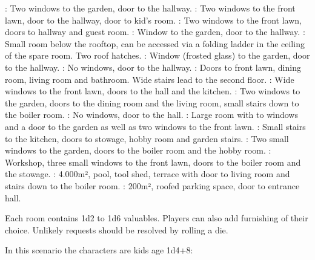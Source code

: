 {		: Two windows to the garden, door to the hallway. : Two windows to the front lawn, door to the hallway, door to kid's room. : Two windows to the front lawn, doors to hallway and guest room. : Window to the garden, door to the hallway. : Small room below the rooftop, can be accessed via a folding ladder in the ceiling of the spare room. Two roof hatches. : Window (frosted glass) to the garden, door to the hallway. : No windows, door to the hallway. : Doors to front lawn, dining room, living room and bathroom. Wide stairs lead to the second floor. : Wide windows to the front lawn, doors to the hall and the kitchen. : Two windows to the garden, doors to the dining room and the living room, small stairs down to the boiler room. : No windows, door to the hall. : Large room with to windows and a door to the garden as well as two windows to the front lawn. :	Small stairs to the kitchen, doors to stowage, hobby room and garden stairs. : Two small windows to the garden, doors to the boiler room and the hobby room. : Workshop, three small windows to the front lawn, doors to the boiler room and the stowage. : 4.000m², pool, tool shed, terrace with door to living room and stairs down to the boiler room. : 200m², roofed parking space, door to entrance hall.

		Each room contains 1d2 to 1d6 valuables. Players can also add furnishing of their choice. Unlikely requests should be resolved by rolling a die.


		\noindent
		In this scenario the characters are kids age 1d4+8:


}
